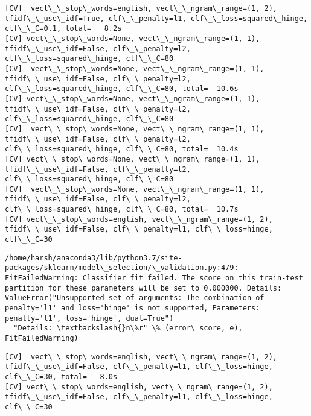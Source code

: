 \documentclass[11pt]{article}
\begin{document}
    \begin{Verbatim}[commandchars=\\\{\}]
[CV]  vect\_\_stop\_words=english, vect\_\_ngram\_range=(1, 2), tfidf\_\_use\_idf=True, clf\_\_penalty=l1, clf\_\_loss=squared\_hinge, clf\_\_C=0.1, total=   8.2s
[CV] vect\_\_stop\_words=None, vect\_\_ngram\_range=(1, 1), tfidf\_\_use\_idf=False, clf\_\_penalty=l2, clf\_\_loss=squared\_hinge, clf\_\_C=80 
[CV]  vect\_\_stop\_words=None, vect\_\_ngram\_range=(1, 1), tfidf\_\_use\_idf=False, clf\_\_penalty=l2, clf\_\_loss=squared\_hinge, clf\_\_C=80, total=  10.6s
[CV] vect\_\_stop\_words=None, vect\_\_ngram\_range=(1, 1), tfidf\_\_use\_idf=False, clf\_\_penalty=l2, clf\_\_loss=squared\_hinge, clf\_\_C=80 
[CV]  vect\_\_stop\_words=None, vect\_\_ngram\_range=(1, 1), tfidf\_\_use\_idf=False, clf\_\_penalty=l2, clf\_\_loss=squared\_hinge, clf\_\_C=80, total=  10.4s
[CV] vect\_\_stop\_words=None, vect\_\_ngram\_range=(1, 1), tfidf\_\_use\_idf=False, clf\_\_penalty=l2, clf\_\_loss=squared\_hinge, clf\_\_C=80 
[CV]  vect\_\_stop\_words=None, vect\_\_ngram\_range=(1, 1), tfidf\_\_use\_idf=False, clf\_\_penalty=l2, clf\_\_loss=squared\_hinge, clf\_\_C=80, total=  10.7s
[CV] vect\_\_stop\_words=english, vect\_\_ngram\_range=(1, 2), tfidf\_\_use\_idf=False, clf\_\_penalty=l1, clf\_\_loss=hinge, clf\_\_C=30 

    \end{Verbatim}

    \begin{Verbatim}[commandchars=\\\{\}]
/home/harsh/anaconda3/lib/python3.7/site-packages/sklearn/model\_selection/\_validation.py:479: FitFailedWarning: Classifier fit failed. The score on this train-test partition for these parameters will be set to 0.000000. Details: 
ValueError("Unsupported set of arguments: The combination of penalty='l1' and loss='hinge' is not supported, Parameters: penalty='l1', loss='hinge', dual=True")
  "Details: \textbackslash{}n\%r" \% (error\_score, e), FitFailedWarning)

    \end{Verbatim}

    \begin{Verbatim}[commandchars=\\\{\}]
[CV]  vect\_\_stop\_words=english, vect\_\_ngram\_range=(1, 2), tfidf\_\_use\_idf=False, clf\_\_penalty=l1, clf\_\_loss=hinge, clf\_\_C=30, total=   8.0s
[CV] vect\_\_stop\_words=english, vect\_\_ngram\_range=(1, 2), tfidf\_\_use\_idf=False, clf\_\_penalty=l1, clf\_\_loss=hinge, clf\_\_C=30 

    \end{Verbatim}
\end{document}
